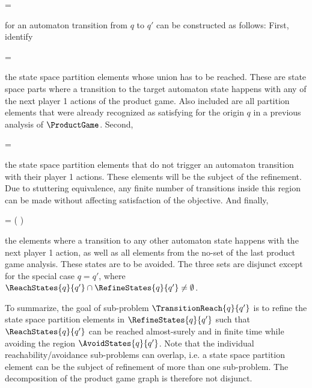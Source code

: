     \startformula
         = 
    \stopformula

    for an automaton transition from $q$ to $q'$ can be constructed as follows:
    First, identify

    \startformula
         =  \EndComma
    \stopformula

    the state space partition elements whose union has to be reached.
    These are state space parts where a transition to the target automaton state happens with any of the next player 1 actions of the product game.
    Also included are all partition elements that were already recognized as satisfying for the origin $q$ in a previous analysis of $\ProductGame$.
    Second,

    \startformula
         =  \EndComma
    \stopformula

    the state space partition elements that do not trigger an automaton transition with their player 1 actions.
    These elements will be the subject of the refinement.
    Due to stuttering equivalence, any finite number of transitions inside this region can be made without affecting satisfaction of the objective.
    And finally,

    \startformula
         =  \setminus \left(  \cup {} \right) \EndComma
    \stopformula

    the elements where a transition to any other automaton state happens with the next player 1 action, as well as all elements from the no-set of the last product game analysis.
    These states are to be avoided.
    The three sets are disjunct except for the special case $q = q'$, where $\ReachStates{q}{q'} \cap \RefineStates{q}{q'} \ne \emptyset$.

    To summarize, the goal of sub-problem $\TransitionReach{q}{q'}$ is to refine the state space partition elements in $\RefineStates{q}{q'}$ such that $\ReachStates{q}{q'}$ can be reached almost-surely and in finite time while avoiding the region $\AvoidStates{q}{q'}$.
    Note that the individual reachability/avoidance sub-problems can overlap, i.e. a state space partition element can be the subject of refinement of more than one sub-problem.
    The decomposition of the product game graph is therefore not disjunct.

